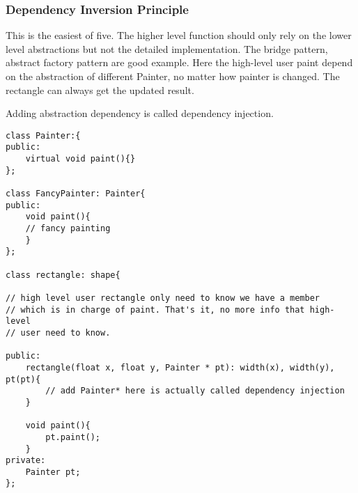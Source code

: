 \subsubsection{Dependency Inversion Principle}

This is the easiest of five. The higher level function should only rely on the lower level abstractions but not the detailed implementation.
The bridge pattern, abstract factory pattern are good example. Here the high-level user paint depend on the abstraction of different Painter,
no matter how painter is changed. The rectangle can always get the updated result.

Adding abstraction dependency is called dependency injection.

\begin{lstlisting}
class Painter:{
public:
	virtual void paint(){}
};

class FancyPainter: Painter{
public:
	void paint(){
	// fancy painting
	}
};

class rectangle: shape{

// high level user rectangle only need to know we have a member
// which is in charge of paint. That's it, no more info that high-level
// user need to know.

public:
	rectangle(float x, float y, Painter * pt): width(x), width(y), pt(pt){
		// add Painter* here is actually called dependency injection
	}

	void paint(){
		pt.paint();
	}
private:
	Painter pt;
};

\end{lstlisting}

